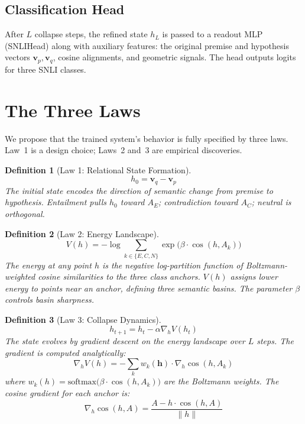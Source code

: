 \documentclass[11pt]{article}
\newtheorem{definition}{Definition}
\newcommand{\vech}{\bm{h}}
\newcommand{\anchor}[1]{A_{#1}}
\begin{document}
\subsection{Classification Head}

After $L$ collapse steps, the refined state $h_L$ is passed to a readout
MLP (SNLIHead) along with auxiliary features: the original premise and
hypothesis vectors $\bm{v}_p, \bm{v}_q$, cosine alignments, and
geometric signals. The head outputs logits for three SNLI classes.

\section{The Three Laws}
\label{sec:laws}

We propose that the trained system's behavior is fully specified by
three laws. Law~1 is a design choice; Laws~2 and~3 are empirical
discoveries.

\begin{definition}[Law 1: Relational State Formation]
\begin{equation}
    h_0 = \bm{v}_q - \bm{v}_p
\end{equation}
The initial state encodes the \emph{direction of semantic change} from
premise to hypothesis. Entailment pulls $h_0$ toward $\anchor{E}$;
contradiction toward $\anchor{C}$; neutral is orthogonal.
\end{definition}

\begin{definition}[Law 2: Energy Landscape]
\begin{equation}
\label{eq:energy}
    V(h) = -\log\!\sum_{k \in \{E,C,N\}} \exp\!\big(\beta \cdot \cos(h, \anchor{k})\big)
\end{equation}
The energy at any point $h$ is the negative log-partition function of
Boltzmann-weighted cosine similarities to the three class anchors.
$V(h)$ assigns lower energy to points near an anchor, defining three
semantic basins. The parameter $\beta$ controls basin sharpness.
\end{definition}

\begin{definition}[Law 3: Collapse Dynamics]
\begin{equation}
\label{eq:collapse}
    h_{t+1} = h_t - \alpha \nabla_h V(h_t)
\end{equation}
The state evolves by gradient descent on the energy landscape over $L$
steps. The gradient is computed analytically:
\begin{equation}
\label{eq:gradient}
    \nabla_h V(h) = -\sum_{k} w_k(\vech) \cdot \nabla_h \cos(h, \anchor{k})
\end{equation}
where $w_k(h) = \text{softmax}\big(\beta \cdot \cos(h, \anchor{k})\big)$
are the Boltzmann weights. The cosine gradient for each anchor is:
\begin{equation}
    \nabla_h \cos(h, A) = \frac{A - h \cdot \cos(h, A)}{\|h\|}
\end{equation}
\end{definition}
\end{document}
